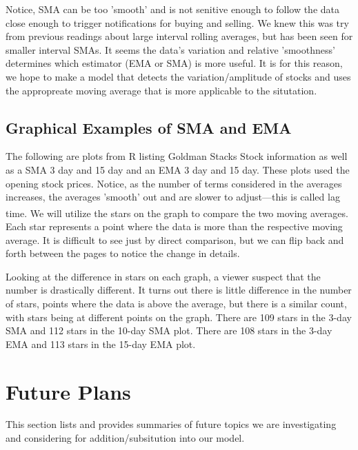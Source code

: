 \documentclass[11pt]{article}
\begin{document}
Notice, SMA can be too 'smooth' and is not senitive enough to follow the data close enough to trigger notifications for buying and selling. We knew this was try from previous readings about large interval rolling averages, but has been seen for smaller interval SMAs. It seems the data's variation and relative 'smoothness' determines which estimator (EMA or SMA) is more useful. It is for this reason, we hope to make a model that detects the variation/amplitude of stocks and uses the appropreate moving average that is more applicable to the situtation.



\subsection*{Graphical Examples of SMA and EMA}\label{GRAPH}
The following are plots from R listing Goldman Stacks Stock information as well as a SMA 3 day and 15 day and an EMA 3 day and 15 day. These plots used the opening stock prices. Notice, as the number of terms considered in the averages increases, the averages 'smooth' out and are slower to adjust---this is called lag time.\textsuperscript{\cite{INV}} We will utilize the stars on the graph to compare the two moving averages. Each star represents a point where the data is more than the respective moving average. It is difficult to see just by direct comparison, but we can flip back and forth between the pages to notice the change in details.

Looking at the difference in stars on each graph, a viewer suspect that the number is drastically different. It turns out there is little difference in the number of stars, points where the data is above the average, but there is a similar count, with stars being at different points on the graph. There are 109 stars in the 3-day SMA and 112 stars in the 10-day SMA plot. There are 108 stars in the 3-day EMA and 113 stars in the 15-day EMA plot.

%
%



\section*{\hspace{-.5cm}Future Plans} \label{FP}
This section lists and provides summaries of future topics we are investigating and considering for addition/subsitution into our model.
\end{document}
